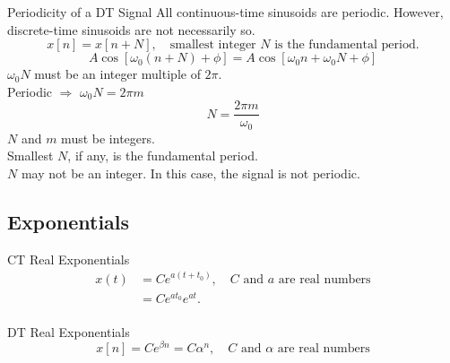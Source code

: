\begin{frame}{Periodicity of a DT Signal}
    All continuous-time sinusoids are  periodic. However, discrete-time sinusoids are not necessarily so.
    \begin{equation}
        x[n] = x[n+N], \quad \text{smallest integer $N$ is the fundamental period}.
    \end{equation}
    {
        \begin{equation*}
            A\cos[\omega_0(n+N) + \phi] = A\cos[\omega_0n+ \omega_0N + \phi]
        \end{equation*}
        $ \omega_0N$ must be an integer multiple of $2\pi$.\\
        Periodic $\Rightarrow$ $\omega_0N = 2\pi m$
        \begin{equation}\label{eq:dt_period}
            N = \frac{2\pi m}{\omega_0}
        \end{equation}
        $N$ and $m$ must be integers.\\
        Smallest $N$, if any, is the fundamental period.\\
        $N$ may not be an integer. In this case, the signal is not periodic.
    }
\end{frame}

\subsection{Exponentials}

\begin{frame}[plain]{CT Real Exponentials}
    \begin{equation*}
        \begin{split}
            x(t) &= Ce^{a(t+t_0)}, \quad C \text{ and } a \text{ are real numbers}\\
            &=   Ce^{at_0}e^{at}.\\
        \end{split}
    \end{equation*}
    {
        {
            \centering
            
        }
    }
\end{frame}

\begin{frame}[plain]{DT Real Exponentials}
    \begin{equation*}
        x[n] = Ce^{\beta n} = C\alpha^n, \quad C \text{ and } \alpha \text{ are real numbers}
    \end{equation*}
\end{frame}

